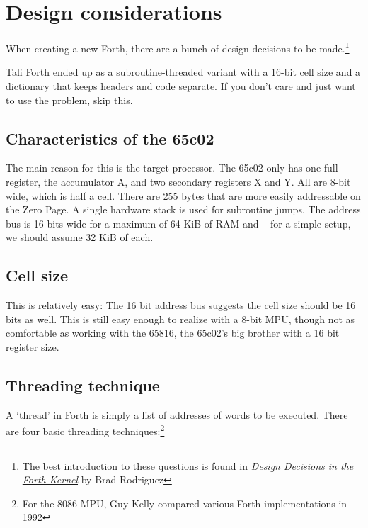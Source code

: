 
\section{Design considerations}

When creating a new Forth, there are a bunch of design decisions to be
made.\footnote{The best introduction to these questions is found in
\href{http://www.bradrodriguez.com/papers/moving1.htm}{\textit{Design Decisions
in the Forth Kernel}} by Brad Rodriguez}

Tali Forth ended up as a subroutine-threaded variant with a 16-bit cell size and
a dictionary that keeps headers and code separate. If you don't care and just
want to use the problem, skip this. 

\subsection{Characteristics of the 65c02}

The main reason for this is the target processor. The 65c02 only has one full
register, the accumulator A, and two secondary registers
X and Y. All are 8-bit wide, which is half a
cell. There are 255 bytes that are more easily addressable on the Zero
Page. A single hardware stack is used for subroutine jumps. The
address bus is 16 bits wide for a maximum of 64 KiB of
RAM and  -- for a simple setup, we should assume 32 KiB of
each. 

\subsection{Cell size}

This is relatively easy: The 16 bit address bus suggests the
cell size should be 16 bits as well. This is still easy enough to realize with a
8-bit MPU, though not as comfortable as working with the 65816, the
65c02's big brother with a 16 bit register size.


\subsection{Threading technique}

A `thread' in Forth is simply a list of addresses of words to be executed. 
There are four basic threading techniques:\footnote{For the 8086 MPU, Guy
Kelly compared various Forth implementations in
1992\cite{kelly92}}

